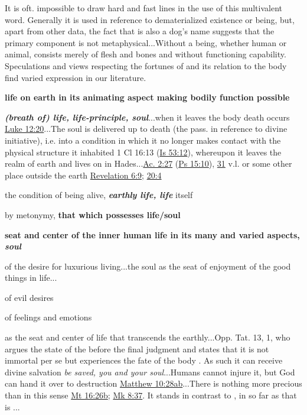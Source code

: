 				\begin{compactdesc}
				
					\item[BDAG 979a] It is oft. impossible to draw hard and fast lines in the use of this multivalent word. Generally it is used in reference to dematerialized existence or being, but, apart from other data, the fact that  is also a dog's name suggests that the primary component is not metaphysical...Without  a being, whether human or animal, consists merely of flesh and bones and without functioning capability. Speculations and views respecting the fortunes of  and its relation to the body find varied expression in our literature.
						\begin{compactitem}
							\item[1] \textbf{life on earth in its animating aspect making bodily function possible}
							\item[1.a] \textbf{\textit{(breath of) life, life-principle, soul}}...when it leaves the body death occurs \hyperref[LUKE-12-20]{Luke 12:20}...The soul is delivered up to death (the pass. in reference to divine initiative), i.e. into a condition in which it no longer makes contact with the physical structure it inhabited 1 Cl 16:13 (\hyperref[ISAIAH-53-12]{Is 53:12}), whereupon it leaves the realm of earth and lives on in Hades...\hyperref[ACTS-2-27]{Ac. 2:27} (\hyperref[PSALMS-15-10]{Ps 15:10}), \hyperref[ACTS-2-31]{31} v.l. or some other place outside the earth \hyperref[REVELATIONNT-6-9]{Revelation 6:9}; \hyperref[REVELATIONNT-20-4]{20:4}
							\item[1.b] the condition of being alive, \textbf{\textit{earthly life, life}} itself
							\item[1.c] by metonymy, \textbf{that which possesses life/soul}
							\item[2] \textbf{seat and center of the inner human life in its many and varied aspects, \textit{soul}}
							\item[2.a] of the desire for luxurious living...the soul as the seat of enjoyment of the good things in life...
							\item[2.b] of evil desires
							\item[2.c] of feelings and emotions
							\item[2.d] as the seat and center of life that transcends the earthly...Opp. Tat. 13, 1, who argues the state of the  before the final judgment and states that it is not immortal per se but experiences the fate of the body . As such it can receive divine salvation  \textit{be saved, you and your soul}...Humans cannot injure it, but God can hand it over to destruction \hyperref[MATTHEW-10-28]{Matthew 10:28ab}...There is nothing more precious than  in this sense \hyperref[MATTHEW-16-26]{Mt 16:26b}; \hyperref[MARK-8-37]{Mk 8:37}. It stands in contrast to , in so far as that is ...

\end{compactitem}
\end{compactdesc}
